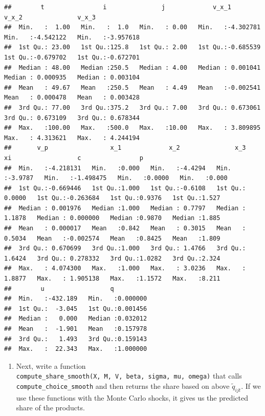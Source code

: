 \documentclass[
]{book}
\providecommand{\tightlist}{%
  \setlength{\itemsep}{0pt}\setlength{\parskip}{0pt}}
\begin{document}
\begin{verbatim}
##        t                i               j             v_x_1               v_x_2               v_x_3          
##  Min.   :  1.00   Min.   :  1.0   Min.   : 0.00   Min.   :-4.302781   Min.   :-4.542122   Min.   :-3.957618  
##  1st Qu.: 23.00   1st Qu.:125.8   1st Qu.: 2.00   1st Qu.:-0.685539   1st Qu.:-0.679702   1st Qu.:-0.672701  
##  Median : 48.00   Median :250.5   Median : 4.00   Median : 0.001041   Median : 0.000935   Median : 0.003104  
##  Mean   : 49.67   Mean   :250.5   Mean   : 4.49   Mean   :-0.002541   Mean   : 0.000478   Mean   : 0.003428  
##  3rd Qu.: 77.00   3rd Qu.:375.2   3rd Qu.: 7.00   3rd Qu.: 0.673061   3rd Qu.: 0.673109   3rd Qu.: 0.678344  
##  Max.   :100.00   Max.   :500.0   Max.   :10.00   Max.   : 3.809895   Max.   : 4.313621   Max.   : 4.244194  
##       v_p                 x_1             x_2               x_3                xi                  c                p        
##  Min.   :-4.218131   Min.   :0.000   Min.   :-4.4294   Min.   :-3.9787   Min.   :-1.498475   Min.   :0.0000   Min.   :0.000  
##  1st Qu.:-0.669446   1st Qu.:1.000   1st Qu.:-0.6108   1st Qu.: 0.0000   1st Qu.:-0.263684   1st Qu.:0.9376   1st Qu.:1.527  
##  Median : 0.001976   Median :1.000   Median : 0.7797   Median : 1.1878   Median : 0.000000   Median :0.9870   Median :1.885  
##  Mean   : 0.000017   Mean   :0.842   Mean   : 0.3015   Mean   : 0.5034   Mean   :-0.002574   Mean   :0.8425   Mean   :1.809  
##  3rd Qu.: 0.670699   3rd Qu.:1.000   3rd Qu.: 1.4766   3rd Qu.: 1.6424   3rd Qu.: 0.278332   3rd Qu.:1.0282   3rd Qu.:2.324  
##  Max.   : 4.074300   Max.   :1.000   Max.   : 3.0236   Max.   : 1.8877   Max.   : 1.905138   Max.   :1.1572   Max.   :8.211  
##        u                  q           
##  Min.   :-432.189   Min.   :0.000000  
##  1st Qu.:  -3.045   1st Qu.:0.001456  
##  Median :   0.000   Median :0.032012  
##  Mean   :  -1.901   Mean   :0.157978  
##  3rd Qu.:   1.493   3rd Qu.:0.159143  
##  Max.   :  22.343   Max.   :1.000000
\end{verbatim}

\begin{enumerate}
\def\labelenumi{\arabic{enumi}.}
\setcounter{enumi}{8}
\tightlist
\item
  Next, write a function \texttt{compute\_share\_smooth(X,\ M,\ V,\ beta,\ sigma,\ mu,\ omega)} that calls \texttt{compute\_choice\_smooth} and then returns the share based on above \(\tilde{q}_{ijt}\). If we use these functions with the Monte Carlo shocks, it gives us the predicted share of the products.
\end{enumerate}
\end{document}
